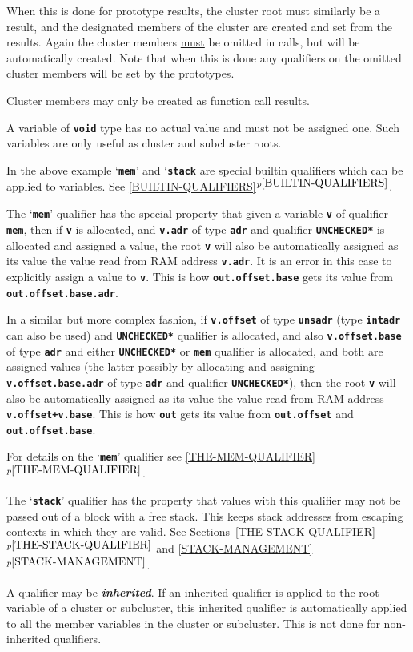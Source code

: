 \documentclass[12pt]{article}
\newcommand{\TT}[1]{{\tt \bfseries #1}}
\newcommand{\ikey}[2]{{\bf \em #1}\index{#2}}
\newcommand{\itemref}[1]{\ref{#1}$^{p\pageref{#1}}$}
\newcommand{\EOL}{\penalty \exhyphenpenalty}
\begin{document}
When this is done for prototype results, the cluster root must similarly
be a result, and the designated
members of the cluster are created and set from the results.
Again the cluster members \underline{must} be omitted in calls,
but will be automatically created.
Note that when this is done any qualifiers on the omitted cluster
members will be set by the prototypes.

Cluster members may only be created as function call results.

A variable of \TT{void} type has no actual value
and must not be assigned one.  Such variables are only useful
as cluster and subcluster roots.

In the above example `\TT{mem}' and `\TT{stack} are special builtin qualifiers
which can be applied to variables.
See \itemref{BUILTIN-QUALIFIERS}.

The `\TT{mem}' qualifier\label{MEM}
has the special property that given a variable
\TT{v} of qualifier \TT{mem}, then if \TT{v} is allocated,
and \TT{v.adr} of type \TT{adr} and qualifier \TT{*UNCHECKED*}
is allocated and
assigned a value, the root \TT{v} will also be automatically
assigned as its value the value read from RAM address \TT{v.adr}.
It is an error in this case to explicitly assign a value to \TT{v}.
This is how \TT{out.offset\EOL .base} gets its value from
\TT{out.offset.base.adr}.

In a similar but more complex fashion, if \TT{v.offset} of type
\TT{unsadr} (type \TT{intadr} can also be used) and \TT{*UNCHECKED*}
qualifier is allocated, and also \TT{v.offset.base} of type \TT{adr}
and either \TT{*UNCHECKED*} or \TT{mem} qualifier is allocated,
and both are assigned values (the latter possibly by allocating
and assigning \TT{v.offset.base.adr} of type \TT{adr} and
qualifier \TT{*UNCHECKED*}), then
the root \TT{v} will also be automatically
assigned as its value the value read from RAM address \TT{v.offset+v.base}.
This is how \TT{out} gets its value from \TT{out.offset}
and \TT{out\EOL .offset\EOL .base}.

For details on the `\TT{mem}' qualifier see \itemref{THE-MEM-QUALIFIER}.

The `\TT{stack}' qualifier has the property that values with
this qualifier may not be passed out of a block with a free
stack.  This keeps stack addresses from escaping contexts in
which they are valid.  See Sections~\itemref{THE-STACK-QUALIFIER} and
\itemref{STACK-MANAGEMENT}.

A qualifier may be \ikey{inherited}{qualifier}\label{INHERITED-QUALIFIER}.
If an inherited qualifier
is applied to the root variable of a cluster
or subcluster, this inherited qualifier is automatically applied to all
the member variables in the cluster or subcluster.  This is not done
for non-inherited qualifiers.
\end{document}
